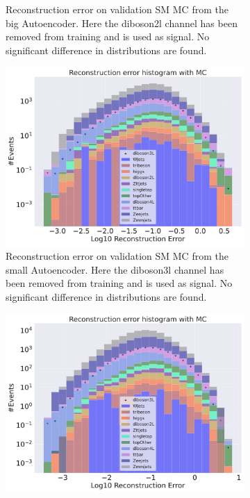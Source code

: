 \begin{figure}[H]
\begin{subfigure}{.45\textwidth}
        \caption{Reconstruction error on validation SM MC from the big Autoencoder. Here the diboson2l channel has been removed from training and 
        is used as signal. No significant difference in distributions are found. }
        \label{fig:vae_big_diboson2l}
    \end{subfigure}
    \hfill 
    \begin{subfigure}{.45\textwidth}
        \includegraphics[width=\textwidth]{Figures/VAE_testing/small/b_data_recon_big_rm3_feats_sig_diboson3l.pdf}
        \caption{Reconstruction error on validation SM MC from the small Autoencoder. Here the diboson3l channel has been removed from training and 
        is used as signal. No significant difference in distributions are found. }
        \label{fig:vae_small_diboson3l}
    \end{subfigure}
    \hfill
    \begin{subfigure}{.45\textwidth}
        \includegraphics[width=\textwidth]{Figures/VAE_testing/big/b_data_recon_big_rm3_feats_sig_diboson3l.pdf}

\end{subfigure}
\end{figure}
